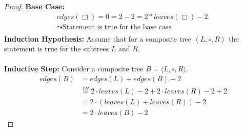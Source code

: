 \documentclass{article} %
\begin{document}
\begin{proof}
	\textbf{Base Case:}
	\begin{align*}
		edges(\Box) = 0 = 2 - 2 = 2 * leaves(\Box) - 2 .     \\
		\leadsto \text{Statement is true for the base case } \\
	\end{align*}
	\textbf{Induction Hypothesis:} Assume that for a composite tree \( \left< L, \circ, R \right> \) the statement is true for the subtrees \( L \) and \( R \).
	\\
	\\
	\textbf{Inductive Step:}
	Consider a composite tree \( B = \langle L, \circ, R \rangle \).
	\begin{align*}
		edges(B) & = edges(L) + edges(B) + 2                                          \\
		         & \stackrel{IH}{=} 2 \cdot leaves(L) - 2 + 2 \cdot leaves(R) - 2 + 2 \\
		         & = 2 \cdot (leaves(L) + leaves(R)) -2                               \\
		         & = 2 \cdot leaves(B) - 2
	\end{align*}

\end{proof}
\newpage
\end{document}
